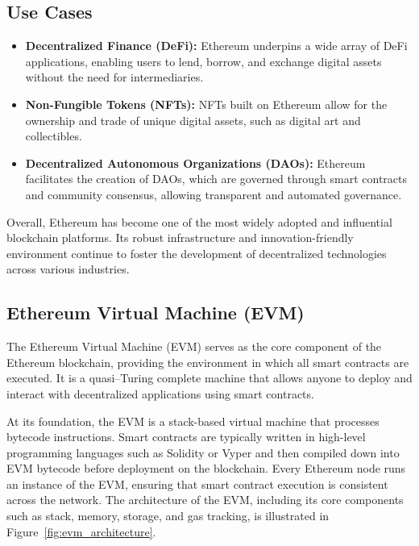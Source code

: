 \subsection{Use Cases}

\begin{itemize}
  \item \textbf{Decentralized Finance (DeFi):} Ethereum underpins a wide array of DeFi applications, enabling users to lend, borrow, and exchange digital assets without the need for intermediaries.
  
  \item \textbf{Non-Fungible Tokens (NFTs):} NFTs built on Ethereum allow for the ownership and trade of unique digital assets, such as digital art and collectibles.
  
  \item \textbf{Decentralized Autonomous Organizations (DAOs):} Ethereum facilitates the creation of DAOs, which are governed through smart contracts and community consensus, allowing transparent and automated governance.
\end{itemize}

Overall, Ethereum has become one of the most widely adopted and influential blockchain platforms. Its robust infrastructure and innovation-friendly environment continue to foster the development of decentralized technologies across various industries.

\subsection{Ethereum Virtual Machine (EVM)}
The Ethereum Virtual Machine (EVM) serves as the core component of the Ethereum blockchain, providing the environment in which all smart contracts are executed. It is a quasi–Turing complete machine that allows anyone to deploy and interact with decentralized applications using smart contracts.

At its foundation, the EVM is a stack-based virtual machine that processes bytecode instructions. Smart contracts are typically written in high-level programming languages such as Solidity or Vyper and then compiled down into EVM bytecode before deployment on the blockchain. Every Ethereum node runs an instance of the EVM, ensuring that smart contract execution is consistent across the network. The architecture of the EVM, including its core components such as stack, memory, storage, and gas tracking, is illustrated in Figure~\ref{fig:evm_architecture}.

